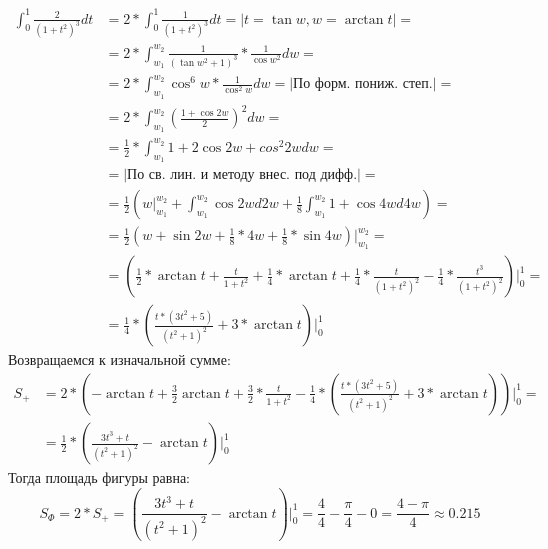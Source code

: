 \documentclass[12pt, a4paper]{article}
\begin{document}
\begin{equation*}
\begin{aligned}
\int_{0}^{1} \frac{2}{\left(1+t^2\right)^3} dt &= 2 * \int_{0}^{1} \frac{1}{\left(1+t^2\right)^3} dt = |t = \tan{w}, w = \arctan{t}| =\\
&=2 * \int_{w_1}^{w_2} \frac{1}{\left(\tan{w}^2+1\right)^3} * \frac{1}{\cos{w}^2} dw = \\
&= 2 * \int_{w_1}^{w_2} \cos^6{w} * \frac{1}{\cos^2{w}} dw = |\text{По форм. пониж. степ.}| =\\
&= 2 * \int_{w_1}^{w_2} \left(\frac{1+\cos{2w}}{2}\right)^2 dw=\\
&= \frac{1}{2} * \int_{w_1}^{w_2} 1 + 2\cos{2w} + cos^2{2w} dw=\\
&= |\text{По св. лин. и методу внес. под дифф.}| =\\
&= \frac{1}{2} \left(w|_{w_1}^{w_2} +  \int_{w_1}^{w_2} \cos{2w} d2w + \frac{1}{8} \int_{w_1}^{w_2} 1 + \cos{4w} d4w\right)  =\\
&= \frac{1}{2} \left(w +  \sin{2w} + \frac{1}{8} * 4w + \frac{1}{8} * \sin{4w}\right)|_{w_1}^{w_2} =\\
&=\left(\frac{1}{2} * \arctan{t} + \frac{t}{1+t^2} + \frac{1}{4} * \arctan{t} + \frac{1}{4} * \frac{t}{(1+t^2)^2} - \frac{1}{4} * \frac{t^3}{(1+t^2)^2}\right)|_0^1 =\\
&= \frac{1}{4} * \left(\frac{t*(3t^2+5)}{(t^2+1)^2} + 3*\arctan{t}\right)|_0^1
\end{aligned}
\end{equation*}
Возвращаемся к изначальной сумме:
\begin{equation*}
\begin{aligned}
S_{+} &= 2 * \left( -\arctan{t} + \frac{3}{2}\arctan{t} + \frac{3}{2}*\frac{t}{1+t^2} - \frac{1}{4} * \left(\frac{t*(3t^2+5)}{(t^2+1)^2} + 3*\arctan{t}\right)\right)|_0^1=\\
&= \frac{1}{2} * \left(\frac{3t^3+t}{(t^2+1)^2}-\arctan{t}\right)|_0^1
\end{aligned}
\end{equation*}
Тогда площадь фигуры равна:
\begin{equation}
S_\Phi = 2*S_{+} = \left(\frac{3t^3+t}{(t^2+1)^2}-\arctan{t}\right)|_0^1 = \frac{4}{4} - \frac{\pi}{4} - 0 = \frac{4-\pi}{4} \approx 0.215
\end{equation}
\end{document}
